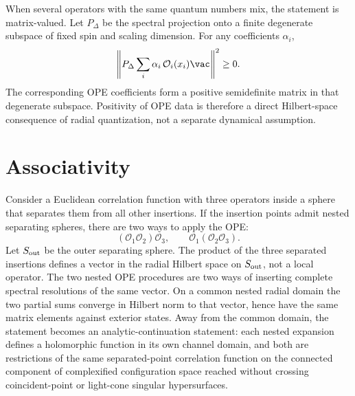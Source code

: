 When several operators with the same quantum numbers mix, the statement is
matrix-valued.  Let \(P_\Delta\) be the spectral projection onto a finite
degenerate subspace of fixed spin and scaling dimension.  For any coefficients
\(\alpha_i\),
\[
  \left\|
    P_\Delta
    \sum_i\alpha_i\,\mathcal O_i(x_i)\vac
  \right\|^2
  \ge0 .
\]
The corresponding OPE coefficients form a positive semidefinite matrix in
that degenerate subspace.  Positivity of OPE data is therefore a direct
Hilbert-space consequence of radial quantization, not a separate dynamical
assumption.

\section{Associativity}

Consider a Euclidean correlation function with three operators inside a sphere
that separates them from all other insertions.  If the insertion points admit
nested separating spheres, there are two ways to apply the OPE:
\[
  (\mathcal O_1\mathcal O_2)\mathcal O_3,
  \qquad
  \mathcal O_1(\mathcal O_2\mathcal O_3).
\]
Let \(S_{\rm out}\) be the outer separating sphere.  The product of the three
separated insertions defines a vector in the radial Hilbert space on
\(S_{\rm out}\), not a local operator.
The two nested OPE procedures are two ways of inserting complete spectral
resolutions of the same vector.  On a common nested radial domain the two
partial sums converge in Hilbert norm to that vector, hence have the same
matrix elements against exterior states.  Away from the common domain, the
statement becomes an analytic-continuation statement: each nested expansion
defines a holomorphic function in its own channel domain, and both are
restrictions of the same separated-point correlation function on the
connected component of complexified configuration space reached without
crossing coincident-point or light-cone singular hypersurfaces.


